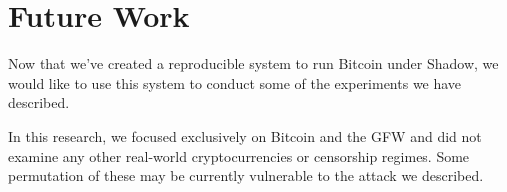 \section{Future Work}
Now that we’ve created a reproducible system to run Bitcoin under Shadow, we would like to use this system to conduct some of the experiments we have described.

In this research, we focused exclusively on Bitcoin and the GFW and did not examine any other real-world cryptocurrencies or censorship regimes. Some permutation of these may be currently vulnerable to the attack we described. 
